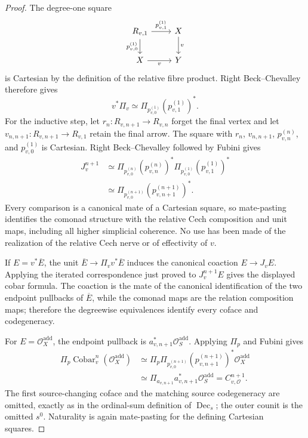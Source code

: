 \begin{proof}
The degree-one square
\[
\begin{tikzcd}
R_{v,1} \arrow[r,"p_{v,1}^{(1)}"] \arrow[d,"p_{v,0}^{(1)}"'] &
X \arrow[d,"v"]\\
X \arrow[r,"v"'] & Y
\end{tikzcd}
\]
is Cartesian by the definition of the relative fibre product.  Right
Beck--Chevalley therefore gives
\[
    v^*\Pi_v
    \simeq
    \Pi_{p_{v,0}^{(1)}}(p_{v,1}^{(1)})^*.
\]
For the inductive step, let
$r_n:R_{v,n+1}\to R_{v,n}$ forget the final vertex and let
$v_{n,n+1}:R_{v,n+1}\to R_{v,1}$ retain the final arrow.  The square with
$r_n$, $v_{n,n+1}$, $p_{v,n}^{(n)}$, and $p_{v,0}^{(1)}$ is Cartesian.
Right Beck--Chevalley followed by Fubini gives
\[
\begin{aligned}
J_v^{n+1}
&\simeq
\Pi_{p_{v,0}^{(n)}}
(p_{v,n}^{(n)})^*\Pi_{p_{v,0}^{(1)}}(p_{v,1}^{(1)})^*\\
&\simeq
\Pi_{p_{v,0}^{(n+1)}}
(p_{v,n+1}^{(n+1)})^*.
\end{aligned}
\]
Every comparison is a canonical mate of a Cartesian square, so mate-pasting
identifies the comonad structure with the relative Cech composition and unit
maps, including all higher simplicial coherence.  No use has been made of
the realization of the relative Cech nerve or of effectivity of $v$.

If $E=v^*\overline E$, the unit
$\overline E\to\Pi_vv^*\overline E$ induces the canonical coaction
$E\to J_vE$.  Applying the iterated correspondence just proved to
$J_v^{n+1}E$ gives the displayed cobar formula.  The coaction is the mate of
the canonical identification of the two endpoint pullbacks of
$\overline E$, while the comonad maps are the relation composition maps;
therefore the degreewise equivalences identify every coface and
codegeneracy.

For $E=\mathcal O_X^{\mathrm{add}}$, the endpoint pullback is
$a_{v,n+1}^*\mathcal O_S^{\mathrm{add}}$.  Applying $\Pi_p$ and Fubini gives
\[
\begin{aligned}
\Pi_p\operatorname{Cobar}_v^n(\mathcal O_X^{\mathrm{add}})
&\simeq
\Pi_p\Pi_{p_{v,0}^{(n+1)}}
(p_{v,n+1}^{(n+1)})^*\mathcal O_X^{\mathrm{add}}\\
&\simeq
\Pi_{a_{v,n+1}}a_{v,n+1}^*\mathcal O_S^{\mathrm{add}}
=
C_{v,\mathcal O}^{n+1}.
\end{aligned}
\]
The first source-changing coface and the matching source codegeneracy are
omitted, exactly as in the ordinal-sum definition of
$\operatorname{Dec}_s$; the outer counit is the omitted $s^0$.  Naturality is
again mate-pasting for the defining Cartesian squares.
\end{proof}

